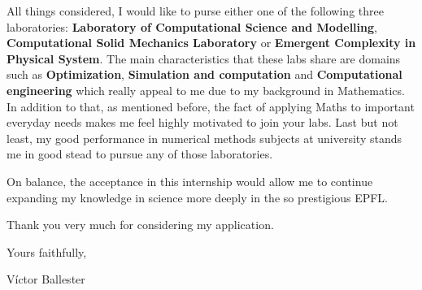 \documentclass{letter}
\newcommand{\uni}{EPFL}
\begin{document}
\begin{letter}
  All things considered, I would like to purse either one of the following three laboratories: \textbf{Laboratory of Computational Science and Modelling}, \textbf{Computational Solid Mechanics Laboratory} or \textbf{Emergent Complexity in Physical System}. The main characteristics that these labs share are domains such as \textbf{Optimization}, \textbf{Simulation and computation} and \textbf{Computational engineering} which really appeal to me due to my background in Mathematics. In addition to that, as mentioned before, the fact of applying Maths to important everyday needs makes me feel highly motivated to join your labs. Last but not least, my good performance in numerical methods subjects at university stands me in good stead to pursue any of those laboratories.

  On balance, the acceptance in this internship would allow me to continue expanding my knowledge in science more deeply in the so prestigious \uni.

  Thank you very much for considering my application.
  \bigskip

  Yours faithfully,

  Víctor Ballester

\end{letter}
\end{document}
